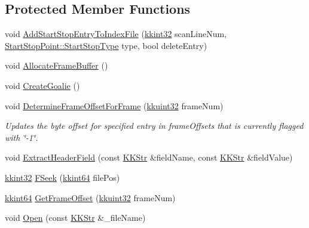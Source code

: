 \subsection*{Protected Member Functions}
\begin{DoxyCompactItemize}
\item 
void \hyperlink{class_k_k_l_s_c_1_1_scanner_file_a4c06af7a47a2aedaedff07f6e4ea6e00}{Add\+Start\+Stop\+Entry\+To\+Index\+File} (\hyperlink{namespace_k_k_b_a8fa4952cc84fda1de4bec1fbdd8d5b1b}{kkint32} scan\+Line\+Num, \hyperlink{class_k_k_l_s_c_1_1_start_stop_point_aca5818602fc58bfe4c9794b311288680}{Start\+Stop\+Point\+::\+Start\+Stop\+Type} type, bool delete\+Entry)
\item 
void \hyperlink{class_k_k_l_s_c_1_1_scanner_file_ac3835a414ea142c1fd7319f6cae1c479}{Allocate\+Frame\+Buffer} ()
\item 
void \hyperlink{class_k_k_l_s_c_1_1_scanner_file_a08e1b410a871d7dae4828143cec78c32}{Create\+Goalie} ()
\item 
void \hyperlink{class_k_k_l_s_c_1_1_scanner_file_ace010560cc943924dfd5c2752616c00d}{Determine\+Frame\+Offset\+For\+Frame} (\hyperlink{namespace_k_k_b_af8d832f05c54994a1cce25bd5743e19a}{kkuint32} frame\+Num)
\begin{DoxyCompactList}\small\item\em Updates the byte offset for specified entry in \textquotesingle{}frame\+Offsets\textquotesingle{} that is currently flagged with \char`\"{}-\/1\char`\"{}. \end{DoxyCompactList}\item 
void \hyperlink{class_k_k_l_s_c_1_1_scanner_file_a8194397977c572ca130f888d9be97d60}{Extract\+Header\+Field} (const \hyperlink{class_k_k_b_1_1_k_k_str}{K\+K\+Str} \&field\+Name, const \hyperlink{class_k_k_b_1_1_k_k_str}{K\+K\+Str} \&field\+Value)
\item 
\hyperlink{namespace_k_k_b_a8fa4952cc84fda1de4bec1fbdd8d5b1b}{kkint32} \hyperlink{class_k_k_l_s_c_1_1_scanner_file_afe1ab170177945ba0c4b2338e2ace59b}{F\+Seek} (\hyperlink{namespace_k_k_b_aa3486b1c5ea9162b3b020c69f72826eb}{kkint64} file\+Pos)
\item 
\hyperlink{namespace_k_k_b_aa3486b1c5ea9162b3b020c69f72826eb}{kkint64} \hyperlink{class_k_k_l_s_c_1_1_scanner_file_a58e50c21ee42be38136ffbca13fa67bf}{Get\+Frame\+Offset} (\hyperlink{namespace_k_k_b_af8d832f05c54994a1cce25bd5743e19a}{kkuint32} frame\+Num)
\item 
void \hyperlink{class_k_k_l_s_c_1_1_scanner_file_a95a2f9e8a5146160222a3ebafde0a7e2}{Open} (const \hyperlink{class_k_k_b_1_1_k_k_str}{K\+K\+Str} \&\+\_\+file\+Name)

\end{DoxyCompactItemize}
